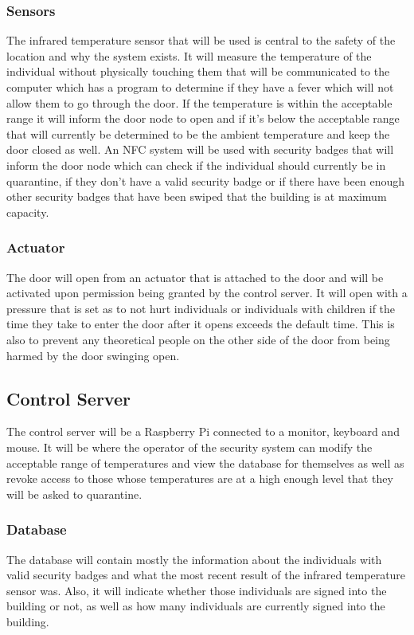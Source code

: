 \subsubsection{Sensors}
The infrared temperature sensor that will be used is central to the safety of the location
and why the system exists. It will measure the temperature of the individual
without physically touching them that will be communicated to the computer which
has a program to determine if they have a fever which will not allow them to go
through the door. If the temperature is within the acceptable range it will
inform the door node to open and if it's below the acceptable range that will
currently be determined to be the ambient temperature and keep the door closed
as well. An NFC system will be used with security badges that will inform the door node
which can check if the individual should currently be in quarantine, if they
don't have a valid security badge or if there have been enough other
security badges that have been
swiped that the building is at maximum capacity.

\subsubsection{Actuator}
The door will open from an actuator that is attached to the door and will be
activated upon permission being granted by the control server. It will open with a
pressure that is set as to not hurt individuals or individuals with children if
the time they take to enter the door after it opens exceeds the default time.
This is also to prevent any theoretical people on the other side of the door
from being harmed by the door swinging open.

\subsection{Control Server}
The control server will be a Raspberry Pi connected to a monitor, keyboard and
mouse. It will be where the operator of the security system can modify the
acceptable range of temperatures and view the database for themselves as well as
revoke access to those whose temperatures are at a high enough level that they
will be asked to quarantine.

\subsubsection{Database}
The database will contain mostly the information about the individuals with
valid security badges and what the most recent result of the infrared temperature sensor was.
Also, it will indicate whether those individuals are signed into the building or
not, as well as how many individuals are currently signed into the building.

